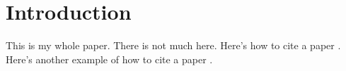 \section{Introduction}\label{introduction}
This is my whole paper. There is not much here. Here's how to cite a
paper \citet{viall_evidence_2012}. Here's another example of how to cite
a paper \citep{warren_constraints_2011}.

